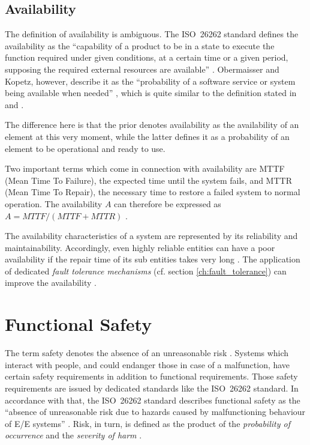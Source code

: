\subsection{Availability}

\label{sec:availability}
The definition of availability is ambiguous. The \mbox{ISO 26262} standard defines the availability as the ``capability of a product to be in a state to execute the function required under given conditions, at a certain time or a given period, supposing the required external resources are available'' \cite{iso26262:1}. Obermaisser and Kopetz, however, describe it as the ``probability of a software service or system being available when needed'' \cite[p.116]{genesys}, which is quite similar to the definition stated in \cite{lessner} and \cite{nelson}.

The difference here is that the prior denotes availability as the availability of an element at this very moment, while the latter defines it as a probability of an element to be operational and ready to use.

Two important terms which come in connection with availability are MTTF (Mean Time To Failure), the expected time until the system fails, and MTTR (Mean Time To Repair), the necessary time to restore a failed system to normal operation. The availability $A$ can therefore be expressed as $A = MTTF/(MTTF + MTTR)$ \cite{nelson}. 

The availability characteristics of a system are represented by its reliability and maintainability. Accordingly, even highly reliable entities can have a poor availability if the repair time of its sub entities takes very long \cite{lessner}. The application of dedicated \emph{fault tolerance mechanisms} (cf. section \ref{ch:fault_tolerance}) can improve the availability \cite{nelson}.





\section{Functional Safety}
\label{ch:functional_safety}

The term safety denotes the absence of an unreasonable risk \cite{iso26262:1}. Systems which interact with people, and could endanger those in case of a malfunction, have certain safety requirements in addition to functional requirements. Those safety requirements are issued by dedicated standards like the \mbox{ISO 26262} standard. In accordance with that, the \mbox{ISO 26262} standard describes functional safety as the ``absence of unreasonable risk due to hazards caused by malfunctioning behaviour of E/E systems'' \cite{iso26262:1}. Risk, in turn, is defined as the product of the \emph{probability of occurrence} and the \emph{severity of harm} \cite{iso26262:1}.

